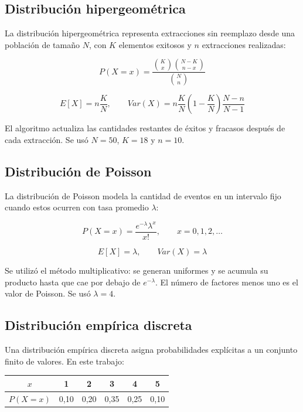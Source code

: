 \documentclass{article}
\begin{document}
\subsection{Distribución hipergeométrica}

La distribución hipergeométrica representa extracciones sin reemplazo desde una
población de tamaño $N$, con $K$ elementos exitosos y $n$ extracciones
realizadas:

\begin{equation}
    P(X=x)=
    \frac{\binom{K}{x}\binom{N-K}{n-x}}{\binom{N}{n}}
\end{equation}

\begin{equation}
    E[X]=n\frac{K}{N}, \qquad
    Var(X)=n\frac{K}{N}\left(1-\frac{K}{N}\right)\frac{N-n}{N-1}
\end{equation}

El algoritmo actualiza las cantidades restantes de éxitos y fracasos después de
cada extracción. Se usó $N=50$, $K=18$ y $n=10$.

\subsection{Distribución de Poisson}

La distribución de Poisson modela la cantidad de eventos en un intervalo fijo
cuando estos ocurren con tasa promedio $\lambda$:

\begin{equation}
    P(X=x)=\frac{e^{-\lambda}\lambda^x}{x!},
    \qquad x=0,1,2,\ldots
\end{equation}

\begin{equation}
    E[X]=\lambda, \qquad Var(X)=\lambda
\end{equation}

Se utilizó el método multiplicativo: se generan uniformes y se acumula su
producto hasta que cae por debajo de $e^{-\lambda}$. El número de factores
menos uno es el valor de Poisson. Se usó $\lambda=4$.

\subsection{Distribución empírica discreta}

Una distribución empírica discreta asigna probabilidades explícitas a un
conjunto finito de valores. En este trabajo:

\begin{center}
\begin{tabular}{cccccc}
\toprule
$x$ & 1 & 2 & 3 & 4 & 5 \\
\midrule
$P(X=x)$ & 0{,}10 & 0{,}20 & 0{,}35 & 0{,}25 & 0{,}10 \\
\bottomrule
\end{tabular}
\end{center}
\end{document}
